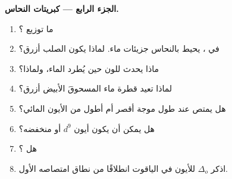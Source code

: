 \begin{problem}
\medskip
\noindent\textbf{الجزء الرابع --- كبريتات النحاس.}
\begin{enumerate}[resume]
  \item ما توزيع ؟
  \item في ، يحيط بالنحاس جزيئات ماء. لماذا يكون الصلب أزرق؟
  \item ماذا يحدث للون حين يُطرد الماء، ولماذا؟
  \item لماذا تعيد قطرة ماء المسحوقَ الأبيض أزرق؟
  \item هل يمتص  عند طول موجة أقصر أم أطول من الأيون المائي؟
  \item هل يمكن أن يكون أيون $d^9$  أو منخفضه؟
  \item هل  ؟
  \item اذكر $\Delta_o$ للأيون  في الياقوت انطلاقًا من نطاق امتصاصه الأول.
\end{enumerate}
\end{problem}
